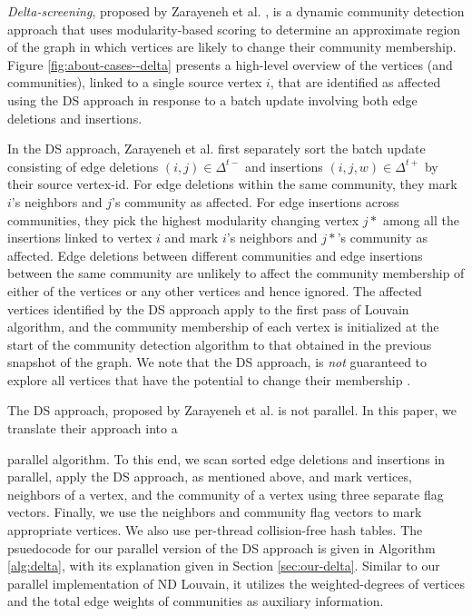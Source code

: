 \textit{Delta-screening}, proposed by Zarayeneh et al. \cite{com-zarayeneh21}, is a dynamic community detection approach that uses modularity-based scoring to determine an approximate region of the graph in which vertices are likely to change their community membership. Figure \ref{fig:about-cases--delta} presents a high-level overview of the vertices (and communities), linked to a single source vertex $i$, that are identified as affected using the DS approach in response to a batch update involving both edge deletions and insertions. In the DS approach, Zarayeneh et al. first separately sort the batch update consisting of edge deletions $(i, j) \in \Delta^{t-}$ and insertions $(i, j, w) \in \Delta^{t+}$ by their source vertex-id. For edge deletions within the same community, they mark $i$'s neighbors and $j$'s community as affected. For edge insertions across communities, they pick the highest modularity changing vertex $j*$ among all the insertions linked to vertex $i$ and mark $i$'s neighbors and $j*$'s community as affected. Edge deletions between different communities and edge insertions between the same community are unlikely to affect the community membership of either of the vertices or any other vertices and hence ignored. The affected vertices identified by the DS approach apply to the first pass of Louvain algorithm, and the community membership of each vertex is initialized at the start of the community detection algorithm to that obtained in the previous snapshot of the graph. We note that the DS approach, is \textit{not} guaranteed to explore all vertices that have the potential to change their membership \cite{com-zarayeneh21}.

The DS approach, proposed by Zarayeneh et al. \cite{com-zarayeneh21} is not parallel. In this paper, we translate their approach into a parallel algorithm. To this end, we scan sorted edge deletions and insertions in parallel, apply the DS approach, as mentioned above, and mark vertices, neighbors of a vertex, and the community of a vertex using three separate flag vectors. Finally, we use the neighbors and community flag vectors to mark appropriate vertices. We also use per-thread collision-free hash tables. The psuedocode for our parallel version of the DS approach is given in Algorithm \ref{alg:delta}, with its explanation given in Section \ref{sec:our-delta}. Similar to our parallel implementation of ND Louvain, it utilizes the weighted-degrees of vertices and the total edge weights of communities as auxiliary information.
